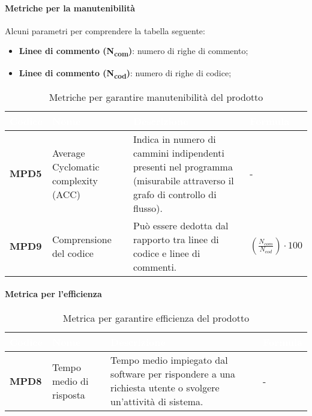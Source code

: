\paragraph{Metriche per la manutenibilità}
Alcuni parametri per comprendere la tabella seguente:
\begin{itemize}
	\item \textbf{Linee di commento (N\textsubscript{com})}: numero di righe di commento;
	\item \textbf{Linee di commento (N\textsubscript{cod})}: numero di righe di codice;
\end{itemize}
\renewcommand{\arraystretch}{1.5}
\renewcommand\extrarowheight{1.5pt}
\begin{longtable}{C{1.5cm} C{4.5cm} C{5.5cm} C{5cm}}
		\textcolor{white}{\textbf{Codice}} & 
		\textcolor{white}{\textbf{Nome}} & 
		\textcolor{white}{\textbf{Descrizione}} & 
		\textcolor{white}{\textbf{Formula}} \\
		\endfirsthead
	    \endfoot
	    \caption{Metriche per garantire manutenibilità del prodotto}
	    \endlastfoot
		\hline
		\textbf{MPD5} & 
		Average Cyclomatic complexity (ACC) & 
		Indica in numero di cammini indipendenti presenti nel programma (misurabile attraverso il grafo di controllo di flusso). & -\\
		\textbf{MPD9} & 
		Comprensione del codice & 
		Può essere dedotta dal rapporto tra linee di codice e linee di commenti. &
		$(\frac{N_{com}}{N_{cod}}) \cdot 100 $ \\
		
\end{longtable}
\paragraph{Metrica per l'efficienza}
\renewcommand{\arraystretch}{1.5}
\renewcommand\extrarowheight{1.5pt}
\begin{longtable}{C{1.5cm} C{4.5cm} C{5.5cm} C{5cm}}
		\textcolor{white}{\textbf{Codice}} & 
		\textcolor{white}{\textbf{Nome}} & 
		\textcolor{white}{\textbf{Descrizione}} & 
		\textcolor{white}{\textbf{Formula}} \\
		\endfirsthead
	    \endfoot
	    \caption{Metrica per garantire efficienza del prodotto}
	    \endlastfoot
		\hline
		\textbf{MPD8} & 
		Tempo medio di risposta & 
		Tempo medio impiegato dal software per rispondere a una richiesta utente o svolgere un'attività di sistema. &
		- \\
\end{longtable}		
